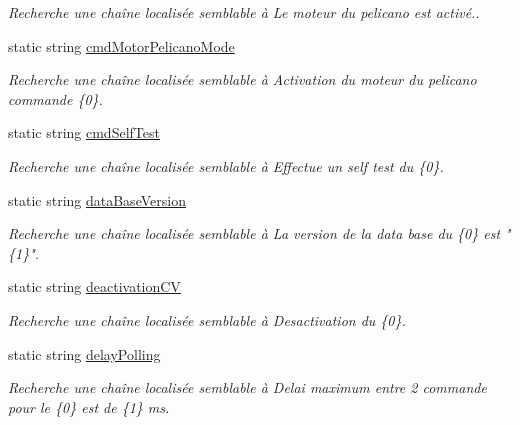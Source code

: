 \begin{DoxyCompactItemize}
\begin{DoxyCompactList}\small\item\em Recherche une chaîne localisée semblable à Le moteur du pelicano est activé.. \end{DoxyCompactList}\item 
static string \mbox{\hyperlink{class_device_library_1_1messages_text_a5ae581131aa224503a54e4a29aa82916}{cmd\+Motor\+Pelicano\+Mode}}
\begin{DoxyCompactList}\small\item\em Recherche une chaîne localisée semblable à Activation du moteur du pelicano commande \{0\}. \end{DoxyCompactList}\item 
static string \mbox{\hyperlink{class_device_library_1_1messages_text_a11e70bc1bf9a2de56400fbab90cb153f}{cmd\+Self\+Test}}
\begin{DoxyCompactList}\small\item\em Recherche une chaîne localisée semblable à Effectue un self test du \{0\}. \end{DoxyCompactList}\item 
static string \mbox{\hyperlink{class_device_library_1_1messages_text_ada1347a59a5832cbebb4ed1fe62a76d4}{data\+Base\+Version}}
\begin{DoxyCompactList}\small\item\em Recherche une chaîne localisée semblable à La version de la data base du \{0\} est "\{1\}". \end{DoxyCompactList}\item 
static string \mbox{\hyperlink{class_device_library_1_1messages_text_ab25fcc8955786b9eb2cc6a0eeb512a0e}{deactivation\+CV}}
\begin{DoxyCompactList}\small\item\em Recherche une chaîne localisée semblable à Desactivation du \{0\}. \end{DoxyCompactList}\item 
static string \mbox{\hyperlink{class_device_library_1_1messages_text_ab9931d675639d2f20b12a5b9d7247d76}{delay\+Polling}}
\begin{DoxyCompactList}\small\item\em Recherche une chaîne localisée semblable à Delai maximum entre 2 commande pour le \{0\} est de \{1\} ms. \end{DoxyCompactList}\item 

\end{DoxyCompactItemize}
